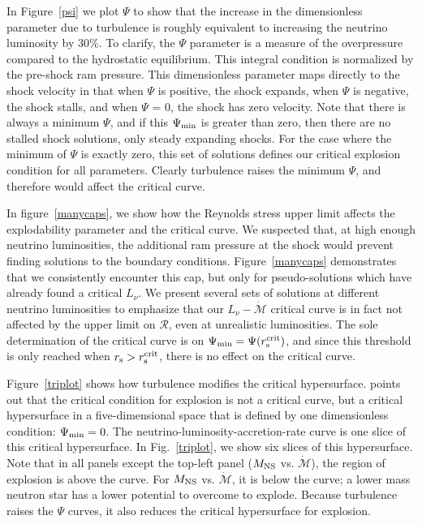\documentclass[twocolumn]{aastex6}
\newcommand{\mdot}{\dot{\mathcal{M}}}
\begin{document}
In Figure~\ref{psi} we plot $\Psi$ to show that the increase in the
  dimensionless parameter due to turbulence is roughly equivalent to
  increasing the neutrino luminosity by 30\%. To clarify, the $\Psi$ parameter is a measure of the
overpressure compared to the hydrostatic equilibrium. This
  integral condition is normalized by the
pre-shock ram pressure. This dimensionless
  parameter maps directly to the shock velocity in that when $\Psi$ is positive, the shock
expands, when $\Psi$ is negative, the shock stalls, and when $\Psi$ =
0, the shock has zero velocity. Note that there is always a
  minimum $\Psi$, and if this $\Psi_{\rm min}$ is greater than zero, then
  there are no stalled shock solutions, only steady expanding shocks.
 For the case where the minimum of
$\Psi$ is exactly zero, this set of solutions defines our critical
explosion condition for all parameters.  Clearly turbulence raises the minimum $\Psi$, and therefore would affect the critical curve. 

In figure~\ref{manycaps}, we show how the Reynolds stress upper limit
affects the explodability parameter and the critical curve. We suspected that, at high enough neutrino luminosities, the additional ram pressure at the shock would prevent finding solutions to the boundary conditions. Figure~\ref{manycaps} demonstrates that we consistently encounter this cap, but only for pseudo-solutions which have already found a critical $L_\nu$. We present several sets of solutions at different neutrino luminosities to emphasize that our $L_\nu-\dot{\mathcal{M}}$ critical curve is in fact not
affected by the upper limit on $\mathcal{R}$, even at unrealistic luminosities. The sole determination of the critical curve is on
$\Psi_{\rm min} = \Psi(r_{\rm s}^{\rm crit})$, and since this threshold is only reached when $r_{\rm s} > r_{\rm s}^{\rm crit}$, there is no effect on the critical curve. 

Figure~\ref{triplot} shows how turbulence
modifies the critical hypersurface. \citet{murphy17} points out that
  the critical condition for explosion is not a critical curve, but a
  critical hypersurface in a five-dimensional space that is defined by
  one dimensionless condition: $\Psi_{\rm min} = 0$.  The neutrino-luminosity-accretion-rate curve
is one slice of this critical hypersurface.  In Fig.~\ref{triplot}, we
show six slices of this hypersurface.  Note that in all panels except the
  top-left panel ($M_{\rm NS}$ vs. $\mdot$), the region of explosion
  is above the curve. For $M_{\rm NS}$ vs. $\mdot$, it is below the
curve; a lower mass neutron star has a lower potential to overcome to
explode. Because turbulence raises the
  $\Psi$ curves, it also reduces the critical hypersurface for
  explosion.
  
\end{document}
